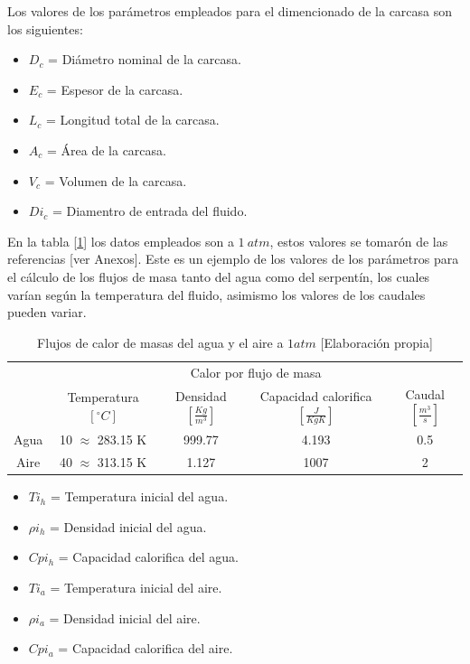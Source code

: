 \documentclass[12pt,letterpaper]{article}     %
\begin{document}
Los valores de los parámetros empleados para el dimencionado de la carcasa son los siguientes:

\begin{itemize}
    \item $D_{c}$ = Diámetro nominal de la carcasa.
    \item $E_{c}$ = Espesor de la carcasa.
    \item $L_{c}$ = Longitud total de la carcasa.
    \item $A_{c}$ = Área de la carcasa.
    \item $V_{c}$ = Volumen de la carcasa.
    \item $Di_{c}$ = Diamentro de entrada del fluido.
\end{itemize}




En la tabla [\ref{tab:flujodemasa}] los datos empleados son a $1 \ atm$, estos valores se tomarón de las referencias \cite{yunus} \cite{Warren} [ver Anexos]. Este es un ejemplo de los valores de los parámetros para el cálculo de los flujos de masa tanto del agua como del serpentín, los cuales varían según la temperatura del fluido, asimismo los valores de los caudales pueden variar.

\begin{table}[!ht]
\caption{Flujos de calor de masas del agua y el aire a $1 atm$  [Elaboración propia]}
\centering
\begin{tabular}{|c|c|c|c|c|}
\hline
& \multicolumn{4}{c|}{Calor por flujo de masa} \\
\cline{2-5}
& Temperatura$[^{\circ}C]$ & Densidad$[\frac{Kg}{m^3}]$ & Capacidad calorifica$[\frac{J}{KgK}]$ & Caudal$[\frac{m^3}{s}]$ \\
\hline \hline
\multirow{1}{1cm}{Agua} & 10 $\approx$ 283.15 K & 999.77 & 4.193 & 0.5\\ \cline{1-5}
\cline{1-4}
Aire & 40 $\approx$ 313.15 K & 1.127 & 1007 & 2 \\ \cline{1-5}
\end{tabular}
\label{tab:flujodemasa}
\end{table}

\begin{itemize}
    \item $Ti_{h}$ = Temperatura inicial del agua.
    \item $\rho i_{h}$ = Densidad inicial del agua.
    \item $Cpi_{h}$ = Capacidad calorifica del agua.
    \item $Ti_{a}$ = Temperatura inicial del aire.
    \item $\rho i_{a}$ = Densidad inicial del aire.
    \item $Cp i_{a}$ = Capacidad calorifica del aire.
\end{itemize}
\end{document}
